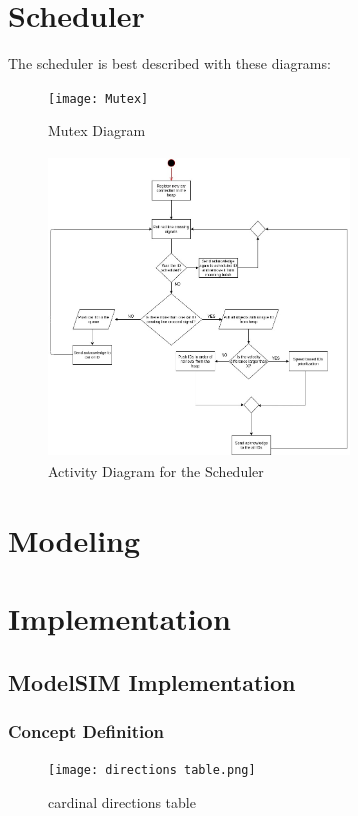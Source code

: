 \documentclass[conference]{IEEEtran}
\begin{document}
\section{Scheduler}
 The scheduler is best described with these diagrams: 
 \begin{figure}[h!]
 	\centerline{\texttt{[image: Mutex]}}
 	\caption{Mutex Diagram}
 \end{figure}
 \begin{figure}[h!]
	\includegraphics[width=8cm, height=8cm]{Activity_diagram_for_scheduler}
	\caption{Activity Diagram for the Scheduler}
	\centering
\end{figure}



\section{Modeling}

\section{Implementation}

\subsection{ModelSIM Implementation}

\subsubsection{Concept Definition}

\begin{figure}[h]
    \centerline{\texttt{[image: directions table.png]}}
    \caption{cardinal directions table}
    \label{directions}
\end{figure}
\end{document}

